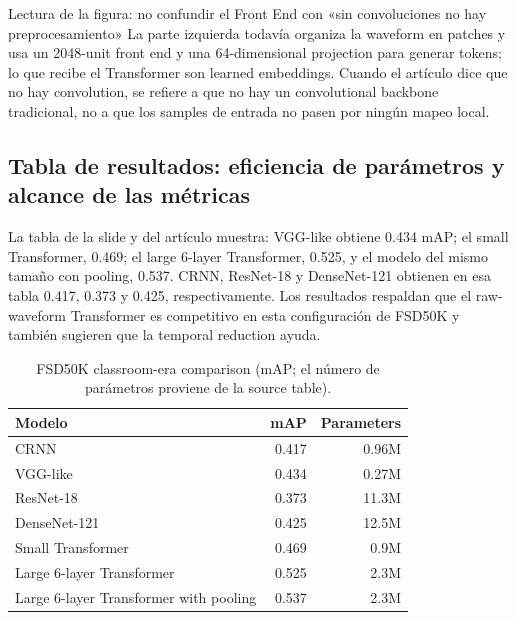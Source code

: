 
\begin{knowledgebox}{Lectura de la figura: no confundir el Front End con «sin convoluciones no hay preprocesamiento»}
La parte izquierda todavía organiza la waveform en patches y usa un 2048-unit front end y una 64-dimensional projection para generar tokens; lo que recibe el Transformer son learned embeddings. Cuando el artículo dice que no hay convolution, se refiere a que no hay un convolutional backbone tradicional, no a que los samples de entrada no pasen por ningún mapeo local.
\end{knowledgebox}

\subsection{Tabla de resultados: eficiencia de parámetros y alcance de las métricas}

La tabla de la slide y del artículo muestra: VGG-like obtiene 0.434 mAP; el small Transformer, 0.469; el large 6-layer Transformer, 0.525, y el modelo del mismo tamaño con pooling, 0.537. CRNN, ResNet-18 y DenseNet-121 obtienen en esa tabla 0.417, 0.373 y 0.425, respectivamente. Los resultados respaldan que el raw-waveform Transformer es competitivo en esta configuración de FSD50K y también sugieren que la temporal reduction ayuda.


\begin{table}[H]
\centering
\small
\caption{FSD50K classroom-era comparison (mAP; el número de parámetros proviene de la source table).}
\begin{tabular}{lrr}
\toprule
Modelo & mAP & Parameters \\
\midrule
CRNN & 0.417 & 0.96M \\
VGG-like & 0.434 & 0.27M \\
ResNet-18 & 0.373 & 11.3M \\
DenseNet-121 & 0.425 & 12.5M \\
Small Transformer & 0.469 & 0.9M \\
Large 6-layer Transformer & 0.525 & 2.3M \\
Large 6-layer Transformer with pooling & 0.537 & 2.3M \\
\bottomrule
\end{tabular}
\end{table}

